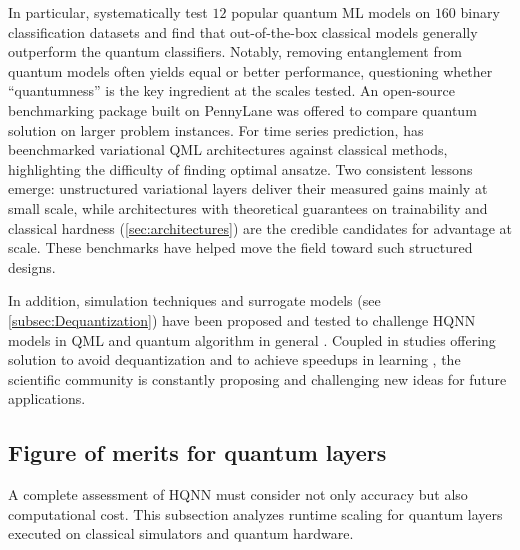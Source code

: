 \documentclass[aps,10pt,groupedaddress,prx,superscriptaddress,twocolumn,balancelastpage, tightenlines]{revtex4-2}
\theoremstyle{plain}  %
\begin{document}
In particular, \cite{bowles2024better} systematically test $12$ popular quantum ML models on $160$ binary classification datasets and find that out-of-the-box classical models generally outperform the quantum classifiers. Notably, removing entanglement from quantum models often yields equal or better performance, questioning whether ``quantumness'' is the key ingredient at the scales tested. An open-source benchmarking package built on PennyLane \cite{bergholm_pennylane_2020} was offered to compare quantum solution on larger problem instances. For time series prediction,  \cite{fellner_quantum_2026} has beenchmarked variational QML architectures against classical methods, highlighting the difficulty of finding optimal ansatze. Two consistent lessons emerge: unstructured variational layers deliver their measured gains mainly at small scale, while architectures with theoretical guarantees on trainability and classical hardness (\autoref{sec:architectures}) are the credible candidates for advantage at scale. These benchmarks have helped move the field toward such structured designs.


In addition, simulation techniques and surrogate models (see \autoref{subsec:Dequantization}) have been proposed and tested to challenge HQNN models in QML \cite{schreiber_classical_2023, bermejo_quantum_2026, sweke_potential_2025, landman_classically_2022, shin_dequantizing_2024} and quantum algorithm in general \cite{tang_quantum_2021, chia_sampling-based_2020, tang_dequantizing_2022, gharibian_dequantizing_2022, fontana_classical_2025}. Coupled in studies offering solution to avoid dequantization \cite{thabet_when_2026, gil2024relation, jerbi_quantum_2023, angrisani_simulating_2026} and to achieve speedups in learning \cite{Huang2022Science, huang2021power, zhao_entanglement-induced_2025, martinez_efficient_2025, gonzalez-garcia_pauli_2025}, the scientific community is constantly proposing and challenging new ideas for future applications. 




        \subsection{Figure of merits for quantum layers}
\label{subsec:runtime}


A complete assessment of HQNN must consider not only accuracy but also computational cost. This subsection analyzes runtime scaling for quantum layers executed on classical simulators and quantum hardware.
\end{document}
